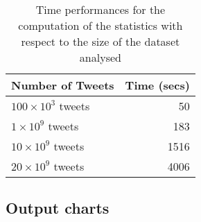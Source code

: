 \begin{table}[htb]
\centering 
\begin{tabular}{|l|r|}
\hline		
Number of Tweets			& Time (secs)\\
\hline
$100\times10^3$ tweets		&	50\\
$1\times10^9$ tweets		& 183\\
$10\times10^9$ tweets 		& 1516\\
$20\times10^9$ tweets 		& 4006\\  
\hline
\end{tabular}
\caption{Time performances for the computation of the statistics with respect to the size of the dataset analysed}
\label{tbl:times}
\end{table}

\subsection{Output charts}
